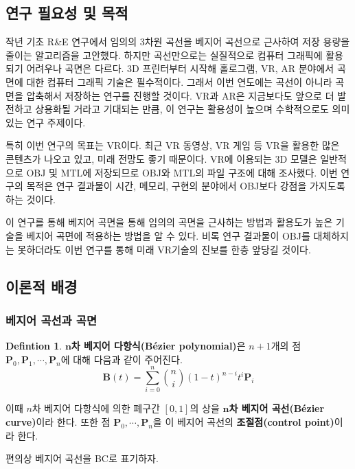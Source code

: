 \documentclass[10pt]{gshs-report-v2.0}
\theoremstyle{theorem}
\theoremstyle{lemma}
\theoremstyle{definition}
\newtheorem{definition}[theorem]{Defintion}
\begin{document}
\subsection{연구 필요성 및 목적}
작년 기초 R\&E 연구에서 임의의 3차원 곡선을 베지어 곡선으로 근사하여 저장 용량을 줄이는 알고리즘을 고안했다.\cite{last year} 하지만 곡선만으로는 실질적으로 컴퓨터 그래픽에 활용되기 어려우나 곡면은 다르다. 3D 프린터부터 시작해 홀로그램, VR, AR 분야에서 곡면에 대한 컴퓨터 그래픽 기술은 필수적이다. 그래서 이번 연도에는 곡선이 아니라 곡면을 압축해서 저장하는 연구를 진행할 것이다. VR과 AR은 지금보다도 앞으로 더 발전하고 상용화될 거라고 기대되는 만큼, 이 연구는 활용성이 높으며 수학적으로도 의미있는 연구 주제이다. 

특히 이번 연구의 목표는 VR이다. 최근 VR 동영상, VR 게임 등 VR을 활용한 많은 콘텐츠가 나오고 있고, 미래 전망도 좋기 때문이다. VR에 이용되는 3D 모델은 일반적으로 OBJ 및 MTL에 저장되므로 OBJ와 MTL의 파일 구조에 대해 조사했다. 이번 연구의 목적은 연구 결과물이 시간, 메모리, 구현의 분야에서 OBJ보다 강점을 가지도록 하는 것이다.

이 연구를 통해 베지어 곡면을 통해 임의의 곡면을 근사하는 방법과 활용도가 높은 기술을 베지어 곡면에 적용하는 방법을 알 수 있다. 비록 연구 결과물이 OBJ를 대체하지는 못하더라도 이번 연구를 통해 미래 VR기술의 진보를 한층 앞당길 것이다.

\subsection{이론적 배경}
\subsubsection{베지어 곡선과 곡면}
\begin{definition} \label{BC}
	\textbf{$\boldsymbol{n}$차 베지어 다항식(Bézier polynomial)}은 $n+1$개의 점 $\mathbf{P}_0, \mathbf{P}_1, \cdots, \mathbf{P}_n$에 대해 다음과 같이 주어진다.
	\begin{equation}
		\mathbf{B}(t)=\sum_{i=0}^n \binom ni(1-t)^{n-i}t^i\mathbf{P}_i
	\end{equation}

	이때 $n$차 베지어 다항식에 의한 폐구간 $[0, 1]$의 상을 \textbf{$\boldsymbol{n}$차 베지어 곡선(Bézier curve)}이라 한다. 또한 점 $\mathbf{P}_0, \cdots, \mathbf{P}_n$을 이 베지어 곡선의 \textbf{조절점(control point)}이라 한다. 
\end{definition}

편의상 베지어 곡선을 BC로 표기하자.
\end{document}

